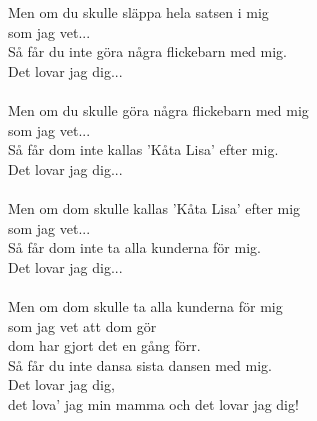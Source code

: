 Men om du skulle släppa hela satsen i mig\\
som jag vet...\\
Så får du inte göra några flickebarn med mig.\\
Det lovar jag dig...\\
\\
Men om du skulle göra några flickebarn med mig\\
som jag vet...\\
Så får dom inte kallas 'Kåta Lisa' efter mig.\\
Det lovar jag dig...\\
\\
Men om dom skulle kallas 'Kåta Lisa' efter mig\\
som jag vet...\\
Så får dom inte ta alla kunderna för mig.\\
Det lovar jag dig...\\
\\
Men om dom skulle ta alla kunderna för mig\\
som jag vet att dom gör\\
dom har gjort det en gång förr.\\
Så får du inte dansa sista dansen med mig.\\
Det lovar jag dig,\\
det lova' jag min mamma och det lovar jag dig!
